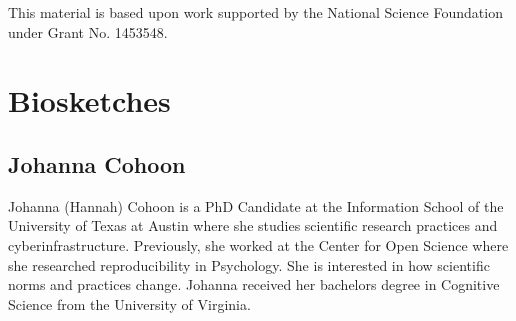 \documentclass[sigchi-a,screen]{acmart}
\begin{document}

\begin{acks}
This material is based upon work supported by the National Science Foundation under Grant No. 1453548.
\end{acks}





\appendix

\section{Biosketches}

\subsection{Johanna Cohoon}
Johanna (Hannah) Cohoon is a PhD Candidate at the Information School of the University of Texas at Austin where she studies scientific research practices and cyberinfrastructure. Previously, she worked at the Center for Open Science where she researched reproducibility in Psychology. She is interested in how scientific norms and practices change. Johanna received her bachelors degree in Cognitive Science from the University of Virginia. 
\end{document}
